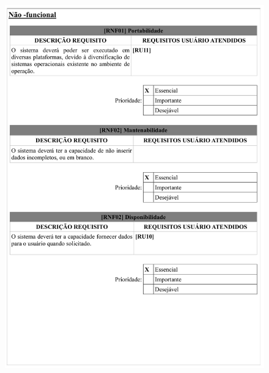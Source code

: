 \begin{figure}
    \includegraphics[width=\textwidth]{documentacao/ModeloArtefatos-04.jpg}
\end{figure}

